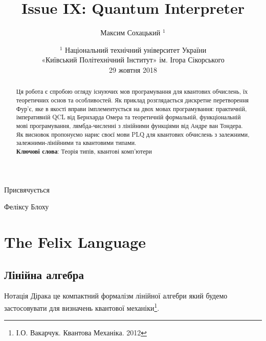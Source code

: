 \documentclass{article}
\theoremstyle{definition}
\begin{document}
\title{Issue IX: Quantum Interpreter}
\author{Максим Сохацький $^1$}
\date{ \small $^1$ Національний технічний університет України \\
       «Київський Політехнічний Інститут» ім. Ігора Сікорського \\
       29 жовтня 2018 }
\maketitle

\begin{abstract}
Ця робота є спробою огляду існуючих мов програмування для квантових обчислень,
їх теоретичних основ та особливостей.
Як приклад розглядається дискретне перетворення Фур'є,
яке в якості вправи імплементується на двох мовах програмування:
практичній, імперативній QCL від Бернхарда Омера\cite{Omer2003} та
теоретичній формальній, функціональній мові програмування, лямбда-численні
з лінійними функціями від Андре ван Тондера\cite{Tonder2004}. Як висновок
пропонуємо нарис своєї мови PLQ для квантових обчислень з залежними,
залежними-лінійними та квантовими типами.
\\
{\bf Ключові слова}: Теорія типів, квантові комп'ютери
\end{abstract}


\ifincludeTOC
  \tableofcontents
\fi

\newpage

\epigraph{Присвячується}{Феліксу Блоху}

\section{The Felix Language}

\subsection{Лінійна алгебра}
Нотація Дірака це компактний формалізм лінійної алгебри який будемо застосовувати
для визначень квантової механіки\footnote{І.О. Вакарчук. Квантова Механіка. 2012}.
\end{document}
